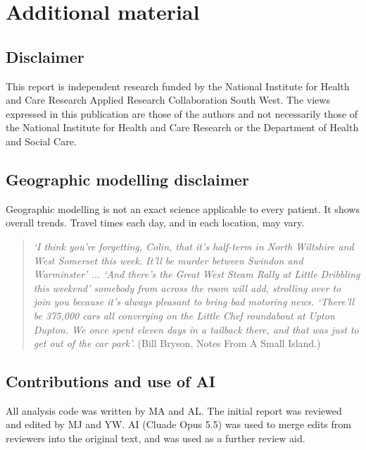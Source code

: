 \section{Additional material}

\subsection{Disclaimer}

This report is independent research funded by the National Institute for Health and Care Research Applied Research Collaboration South West. The views expressed in this publication are those of the authors and not necessarily those of the National Institute for Health and Care Research or the Department of Health and Social Care.

\subsection{Geographic modelling disclaimer}

Geographic modelling is not an exact science applicable to every patient. It shows overall trends. Travel times each day, and in each location, may vary.

\begin{quote}
\textit{`I think you’re forgetting, Colin, that it’s half-term in North Wiltshire and West Somerset this week. It’ll be murder between Swindon and Warminster' ... `And there’s the Great West Steam Rally at Little Dribbling this weekend' somebody from across the room will add, strolling over to join you because it’s always pleasant to bring bad motoring news. `There’ll be 375,000 cars all converging on the Little Chef roundabout at Upton Dupton. We once spent eleven days in a tailback there, and that was just to get out of the car park'.} (Bill Bryson, Notes From A Small Island.)
\end{quote} 

\subsection{Contributions and use of AI}

All analysis code was written by MA and AL. The initial report was reviewed and edited by MJ and YW. AI (Cluade Opus 5.5) was used to merge edits from reviewers into the original text, and was used as a further review aid.

